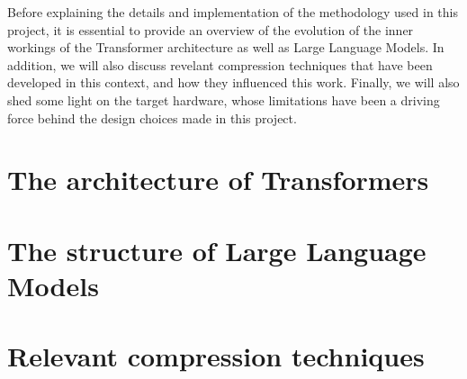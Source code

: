 Before explaining the details and implementation of the methodology used in this project, it is essential to provide an overview of the evolution of the inner workings of the Transformer architecture as well as Large Language Models. In addition, we will also discuss revelant compression techniques that have been developed in this context, and how they influenced this work.
Finally, we will also shed some light on the target hardware, whose limitations have been a driving force behind the design choices made in this project.

\section{The architecture of Transformers}

\section{The structure of Large Language Models}

\section{Relevant compression techniques}


